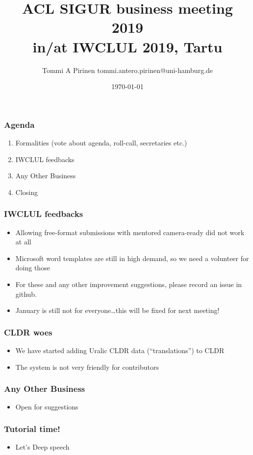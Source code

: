 \documentclass{beamer}
\title{ACL SIGUR business meeting 2019\\
\scriptsize{in/at IWCLUL 2019, Tartu}}
\author{Tommi A Pirinen\scriptsize
\guilsinglleft{}tommi.antero.pirinen@uni-hamburg.de\guilsinglright{}}
\institute{Universität Hamburg\\
Hamburger Zentrum für Sprachkorpora}
\date{\today}
\begin{document}

\maketitle

\begin{frame}
    \frametitle{Agenda}
    \begin{enumerate}
        \item Formalities (vote about agenda, roll-call, secretaries etc.)
        \item IWCLUL feedbacks
        \item Any Other Business
        \item Closing
    \end{enumerate}
\end{frame}


\begin{frame}
    \frametitle{IWCLUL feedbacks}
    \begin{itemize}
        \item Allowing free-format submissions with mentored camera-ready did
            not work at all
        \item Microsoft word templates are still in high demand, so we need a
            volunteer for doing those
        \item For these and any other improvement suggestions, please record an
            issue in github.
        \item January is still not for everyone\ldots this will be fixed for next
            meeting!
    \end{itemize}
\end{frame}

\begin{frame}
    \frametitle{CLDR woes}
    \begin{itemize}
        \item We have started adding Uralic CLDR data (``translations'') to CLDR
        \item The system is not very friendly for contributors
    \end{itemize}
\end{frame}

\begin{frame}
    \frametitle{Any Other Business}
    \begin{itemize}
        \item Open for suggestions
    \end{itemize}
\end{frame}

\begin{frame}
    \frametitle{Tutorial time!}
    \begin{itemize}
        \item Let's Deep speech
    \end{itemize}
\end{frame}
\end{document}
